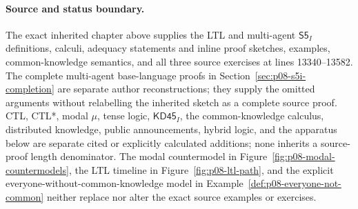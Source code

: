 \paragraph{Source and status boundary.}
The exact inherited chapter above supplies the LTL and multi-agent
\(\mathsf{S5}_{I}\) definitions, calculi, adequacy statements and inline
proof sketches, examples, common-knowledge semantics, and all three source
exercises at lines 13340--13582. The complete multi-agent base-language
proofs in Section~\ref{sec:p08-s5i-completion} are separate author
reconstructions; they supply the omitted arguments without relabelling
the inherited sketch as a complete source proof. CTL, CTL*, modal \(\mu\), tense logic,
\(\mathsf{KD45}_{I}\), the common-knowledge calculus, distributed
knowledge, public announcements, hybrid logic, and the apparatus below are
separate cited or explicitly calculated additions; none inherits a
source-proof length denominator.  The modal countermodel in
Figure~\ref{fig:p08-modal-countermodels}, the LTL timeline in
Figure~\ref{fig:p08-ltl-path}, and the explicit
everyone-without-common-knowledge model in
Example~\ref{def:p08-everyone-not-common} neither replace nor alter the
exact source examples or exercises.
